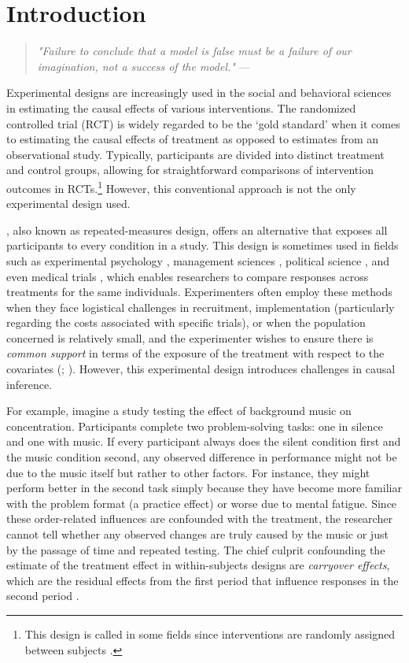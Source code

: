 \section{Introduction}

\begin{quote}
\textit{"Failure to conclude that a model is false must be a failure of our imagination, not a success of the model."}
\hfill --- \cite{mcelreath2018statistical}
\end{quote}

Experimental designs are increasingly used in the social and behavioral sciences in estimating the causal effects of various interventions. The randomized controlled trial (RCT) is widely regarded to be the `gold standard' when it comes to estimating the causal effects of treatment as opposed to estimates from an observational study. Typically, participants are divided into distinct treatment and control groups, allowing for straightforward comparisons of intervention outcomes in RCTs.\footnote{This design is called \bsd{} in some fields since interventions are randomly assigned between subjects \citep{02_maxwell2017designing}.} However, this conventional approach is not the only experimental design used.

\Wsd{}, also known as repeated-measures design, offers an alternative that exposes all participants to every condition in a study. This design is sometimes used in fields such as experimental psychology \citep{keren2014between}, management sciences \citep{Lane2024}, political science \citep{09_Clifford}, and even medical trials \citep{Sarkies2019}, which enables researchers to compare responses across treatments for the same individuals. Experimenters often employ these methods when they face logistical challenges in recruitment, implementation (particularly regarding the costs associated with specific trials), or when the population concerned is relatively small, and the experimenter wishes to ensure there is \textit{common support} in terms of the exposure of the treatment with respect to the covariates (\citealp{02_maxwell2017designing}; \citealp{ErlebacherAlbert1977Daao}). However, this experimental design introduces challenges in causal inference. 

For example, imagine a study testing the effect of background music on concentration. Participants complete two problem-solving tasks: one in silence and one with music. If every participant always does the silent condition first and the music condition second, any observed difference in performance might not be due to the music itself but rather to other factors. For instance, they might perform better in the second task simply because they have become more familiar with the problem format (a practice effect) or worse due to mental fatigue. Since these order-related influences are confounded with the treatment, the researcher cannot tell whether any observed changes are truly caused by the music or just by the passage of time and repeated testing. The chief culprit confounding the estimate of the treatment effect in within-subjects designs are \emph{carryover effects}, which are the residual effects from the first period that influence responses in the second period \citep{02_maxwell2017designing}.


